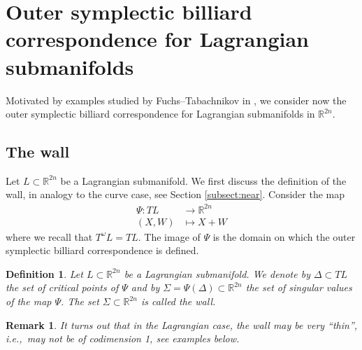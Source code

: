 \documentclass[12pt]{article}
\newtheorem{remark}[lemma]{Remark}
\newtheorem{example}[lemma]{Example}
\newtheorem{definition}[lemma]{Definition}
\newcommand{\R}{{\mathbb R}}
\begin{document}

\section{Outer symplectic billiard correspondence for Lagrangian submanifolds} \label{sect:lag}

Motivated by examples studied by Fuchs--Tabachnikov in \cite{FT2}, we consider now the outer symplectic billiard correspondence for Lagrangian submanifolds in $\R^{2n}$. 

\subsection{The wall}\label{sec:Lagrangian_case_the_wall}

Let $L\subset \R^{2n}$ be a Lagrangian submanifold. We first discuss the definition of the wall, in analogy to the curve case, see Section \ref{subsect:near}. Consider the map
\begin{equation}\label{eqn:Psi_Lagrangian_case}
\begin{aligned}
\Psi:TL&\to \R^{2n}\\
(X,W)&\mapsto X+W
\end{aligned}
\end{equation}
where we recall that $T^\omega L=TL$. The image of $\Psi$ is the domain on which the outer symplectic billiard correspondence is defined. 

\begin{definition}
Let $L\subset \R^{2n}$ be a Lagrangian submanifold. We denote by $\Delta\subset TL$ the set of critical points of $\Psi$ and by $\Sigma=\Psi(\Delta)\subset\R^{2n}$ the set of singular values of the map $\Psi$. The set $\Sigma\subset\R^{2n}$ is called the wall. 
\end{definition}

\begin{remark}
{\rm
It turns out that in the Lagrangian case, the wall may be very ``thin'', i.e.,~may not be of codimension 1, see examples below.
}
\end{remark}
\end{document}
